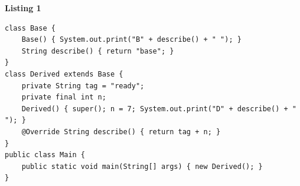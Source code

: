 \documentclass[border=10pt]{standalone}
\begin{document}
\pagecolor{paper}\begin{minipage}{15.5cm}\vspace{4pt}
\textbf{\small\color{gray}Listing 1}\par\vspace{2pt}
\lstset{style=sv}
\begin{lstlisting}
class Base {
    Base() { System.out.print("B" + describe() + " "); }
    String describe() { return "base"; }
}
class Derived extends Base {
    private String tag = "ready";
    private final int n;
    Derived() { super(); n = 7; System.out.print("D" + describe() + " "); }
    @Override String describe() { return tag + n; }
}
public class Main {
    public static void main(String[] args) { new Derived(); }
}
\end{lstlisting}
\vspace{2pt}\end{minipage}
\end{document}
